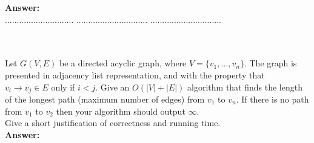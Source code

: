 \documentclass{article}
\begin{document}
\noindent
{\bf Answer:} \\


\pagebreak
{} $.............................$
 $..............................$
          $..............................$

\noindent
{}\\

\\
Let $G(V,E)$ be a directed acyclic graph, where $V=\{ v_1 , \ldots , v_n \}$.
The graph is presented in adjacency list representation, and with the property 
that $v_i \rightarrow v_j \in E$ only if $i < j$. 
Give an $O(|V|+|E|)$ algorithm that finds the length of the longest path (maximum number of edges) from $v_1$ to $v_n$. 
If there is no path from $v_1$ to $v_2$ then your algorithm should output $\infty$.\\
Give a short justification of correctness and running time. \\

\noindent
{\bf Answer:}\\
\end{document}
